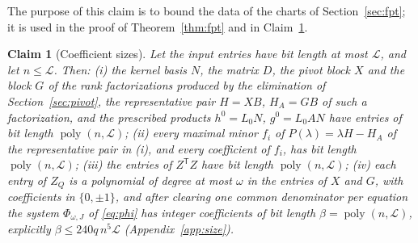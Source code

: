 \documentclass[journal]{IEEEtran}
\theoremstyle{plainn}
\newtheorem{claim}{Claim}
\theoremstyle{remark}
\begin{document}
The purpose of this claim is to bound the data of the charts of Section~\ref{sec:fpt}; it is used in
the proof of Theorem~\ref{thm:fpt} and in Claim~\ref{lem:coeff}.

\begin{claim}[Coefficient sizes]\label{lem:coeff}
Let the input entries have bit length at most $\mathcal L$, and let
$n\le\mathcal L$. Then:
\emph{(i)} the kernel basis $N$, the matrix $D$, the pivot block $X$ and the block $G$ of the
rank factorizations produced by the elimination of Section~\ref{sec:pivot}, the representative pair
$H=XB$, $H_A=GB$ of such a factorization, and the prescribed products $h^0=L_0N$, $g^0=L_0AN$ have
entries of bit length $\operatorname{poly}(n,\mathcal L)$;
\emph{(ii)} every maximal minor $f_i$ of $P(\lambda)=\lambda H-H_A$ of the representative pair in
(i), and every coefficient of $f_i$, has bit length $\operatorname{poly}(n,\mathcal L)$;
\emph{(iii)} the entries of $Z^{\mathsf T}Z$ have bit length
$\operatorname{poly}(n,\mathcal L)$;
\emph{(iv)} each entry of $Z_Q$ is a polynomial of degree at most $\omega$ in the entries of $X$ and
$G$, with coefficients in $\{0,\pm1\}$, and after clearing one common denominator per equation the
system $\Phi_{\omega,J}$ of \eqref{eq:phi} has integer coefficients of bit length
$\beta=\operatorname{poly}(n,\mathcal L)$, explicitly $\beta\le240q\,n^5\mathcal L$
(Appendix~\ref{app:size}).
\end{claim}
\end{document}
